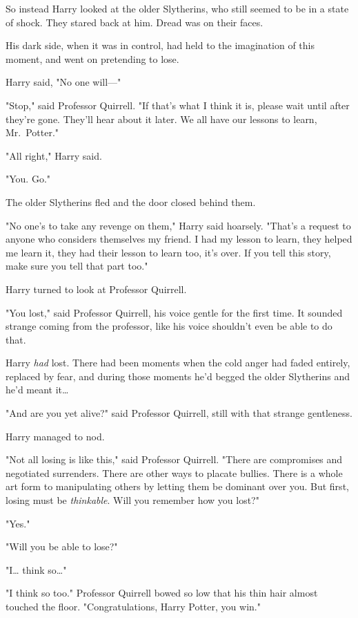 So instead Harry looked at the older Slytherins, who still seemed to be in a 
state of shock. They stared back at him. Dread was on their faces.

His dark side, when it was in control, had held to the imagination of this 
moment, and went on pretending to lose.

Harry said, "No one will---"

"Stop," said Professor Quirrell. "If that's what I think it is, please wait 
until after they're gone. They'll hear about it later. We all have our lessons 
to learn, Mr.~Potter."

"All right," Harry said.

"You. Go."

The older Slytherins fled and the door closed behind them.

"No one's to take any revenge on them," Harry said hoarsely. "That's a request 
to anyone who considers themselves my friend. I had my lesson to learn, they 
helped me learn it, they had their lesson to learn too, it's over. If you tell 
this story, make sure you tell that part too."

Harry turned to look at Professor Quirrell.

"You lost," said Professor Quirrell, his voice gentle for the first time. It 
sounded strange coming from the professor, like his voice shouldn't even be 
able to do that.

Harry \emph{had} lost. There had been moments when the cold anger had faded 
entirely, replaced by fear, and during those moments he'd begged the older 
Slytherins and he'd meant it{\ldots}

"And are you yet alive?" said Professor Quirrell, still with that strange 
gentleness.

Harry managed to nod.

"Not all losing is like this," said Professor Quirrell. "There are compromises 
and negotiated surrenders. There are other ways to placate bullies. There is a 
whole art form to manipulating others by letting them be dominant over you. But 
first, losing must be \emph{thinkable}. Will you remember how you lost?"

"Yes."

"Will you be able to lose?"

"I{\ldots} think so{\ldots}"

"I think so too." Professor Quirrell bowed so low that his thin hair almost 
touched the floor. "Congratulations, Harry Potter, you win."

